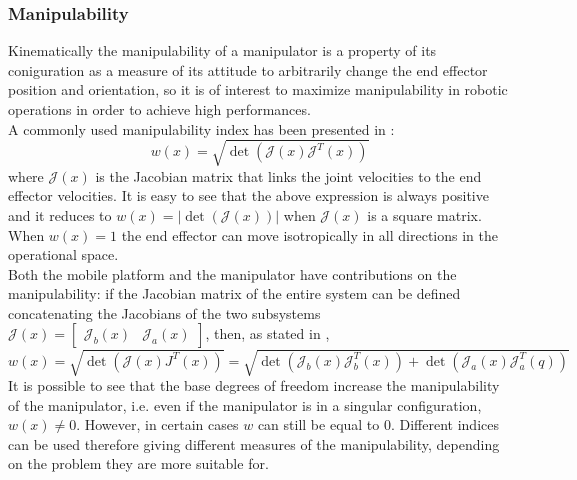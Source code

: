 \subsubsection{Manipulability} 
Kinematically the manipulability of a manipulator is a property of its coniguration as a measure of its attitude to arbitrarily change the end effector position and orientation, so it is of interest to maximize manipulability in robotic operations in order to achieve high performances.\\
A commonly used manipulability index has been presented in \cite{yoshikawa1983} \cite{yoshikawa1985}:
\begin{equation}
w(x) = \sqrt{\det\left(\mathcal{J}(x)\mathcal{J}^T(x)\right)}
\end{equation}
where $\mathcal{J}(x)$ is the Jacobian matrix that links the joint velocities to the end effector velocities. It is easy to see that the above expression is always positive and it reduces to $w(x)=\left| \det\left(\mathcal{J}(x)\right)\right| $ when $\mathcal{J}(x)$ is a square matrix. When $w(x)=1$ the end effector can move isotropically in all directions in the operational space.\\
Both the mobile platform and the manipulator have contributions on the manipulability: if the Jacobian matrix of the entire system can be defined concatenating the Jacobians of the two subsystems $\mathcal{J}(x)=\left[\begin{matrix}\mathcal{J}_b(x)&\mathcal{J}_a(x)\end{matrix}\right]$, then, as stated in \cite{seraji1993},
\begin{equation}
w(x) = \sqrt{\det\left(\mathcal{J}(x)J^T(x)\right)}=\sqrt{\det\left(\mathcal{J}_b(x)\mathcal{J}_b^T(x)\right)+\det\left(\mathcal{J}_a(x)\mathcal{J}_a^T(q)\right)}
\end{equation}
It is possible to see that the base degrees of freedom increase the manipulability of the manipulator, i.e. even if the manipulator is in a singular configuration, $w(x)\neq0$. However, in certain cases $w$ can still be equal to 0. Different indices can be used therefore giving different measures of the manipulability, depending on the problem they are more suitable for.
